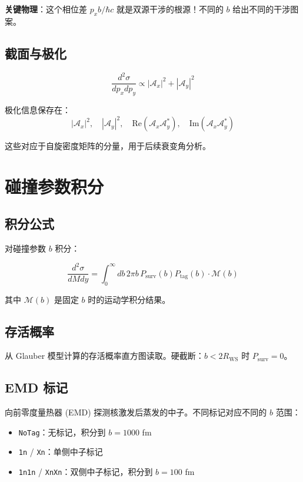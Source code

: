 \documentclass[11pt,a4paper,UTF8]{ctexart}
\begin{document}
\textbf{关键物理}：这个相位差 $p_x b/\hbar c$ 就是双源干涉的根源！不同的 $b$ 给出不同的干涉图案。

\subsection{截面与极化}

\[
\frac{d^2\sigma}{dp_x dp_y} \propto |\mathcal{A}_x|^2 + |\mathcal{A}_y|^2
\]

极化信息保存在：
\[
|\mathcal{A}_x|^2, \quad |\mathcal{A}_y|^2, \quad \text{Re}(\mathcal{A}_x \mathcal{A}_y^*), \quad \text{Im}(\mathcal{A}_x \mathcal{A}_y^*)
\]

这些对应于自旋密度矩阵的分量，用于后续衰变角分析。

\section{碰撞参数积分}

\subsection{积分公式}

对碰撞参数 $b$ 积分：

\[
\frac{d^2\sigma}{dM dy} = \int_0^{\infty} db \, 2\pi b \, P_{\text{surv}}(b) P_{\text{tag}}(b) \cdot \mathcal{M}(b)
\]

其中 $\mathcal{M}(b)$ 是固定 $b$ 时的运动学积分结果。

\subsection{存活概率}

从 Glauber 模型计算的存活概率直方图读取。硬截断：$b < 2R_{\text{WS}}$ 时 $P_{\text{surv}} = 0$。

\subsection{EMD 标记}

向前零度量热器 (EMD) 探测核激发后蒸发的中子。不同标记对应不同的 $b$ 范围：
\begin{itemize}[leftmargin=2em]
    \item \texttt{NoTag}：无标记，积分到 $b = 1000$ fm
    \item \texttt{1n} / \texttt{Xn}：单侧中子标记
    \item \texttt{1n1n} / \texttt{XnXn}：双侧中子标记，积分到 $b = 100$ fm
\end{itemize}
\end{document}
